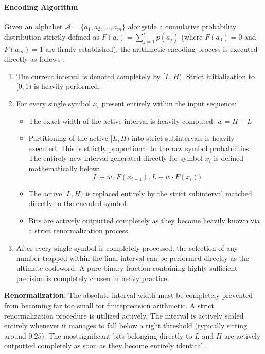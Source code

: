 \paragraph{Encoding Algorithm}

Given an alphabet $\mathcal{A} = \{a_1, a_2, \dots, a_m\}$ alongside a cumulative probability distribution strictly defined as $F(a_i) = \sum_{j=1}^{i} p(a_j)$ (where $F(a_0) = 0$ and $F(a_m) = 1$ are firmly established), the arithmetic encoding process is executed directly as follows \cite{Witten1987}:

\begin{enumerate}
    \item The current interval is denoted completely by $[L, H)$. Strict initialization to $[0, 1)$ is heavily performed.
    \item For every single symbol $x_i$ present entirely within the input sequence:
    \begin{itemize}
        \item The exact width of the active interval is heavily computed: $w = H - L$
        \item Partitioning of the active $[L, H)$ into strict subintervals is heavily executed. This is strictly proportional to the raw symbol probabilities. The entirely new interval generated directly for symbol $x_i$ is defined mathematically below:
        \begin{equation}
            [L + w \cdot F(x_{i-1}), L + w \cdot F(x_i))
        \end{equation}
        \item The active $[L, H)$ is replaced entirely by the strict subinterval matched directly to the encoded symbol.
        \item Bits are actively outputted completely as they become heavily known via a strict renormalization process.
    \end{itemize}
    \item After every single symbol is completely processed, the selection of any number trapped within the final interval can be performed directly as the ultimate codeword. A pure binary fraction containing highly sufficient precision is completely chosen in heavy practice.
\end{enumerate}

\vspace{0.5em}\noindent
\textbf{Renormalization.} The absolute interval width must be completely prevented from becoming far too small for finiteprecision arithmetic. A strict renormalization procedure is utilized actively. The interval is actively scaled entirely whenever it manages to fall below a tight threshold (typically sitting around $0.25$). The mostsignificant bits belonging directly to $L$ and $H$ are actively outputted completely as soon as they become entirely identical \cite{Witten1987}.

